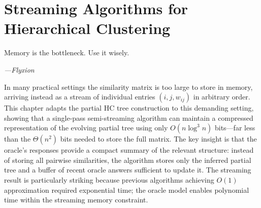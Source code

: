 \chapter{Streaming Algorithms for Hierarchical Clustering}
\label{ch:streaming}

\epigraph{%
  Memory is the bottleneck. Use it wisely.%
}{\textit{---Flyxion}}

In many practical settings the similarity matrix is too large to store in memory, arriving instead as a stream of individual entries $(i, j, w_{ij})$ in arbitrary order. This chapter adapts the partial HC tree construction to this demanding setting, showing that a single-pass semi-streaming algorithm can maintain a compressed representation of the evolving partial tree using only $O(n\log^3 n)$ bits---far less than the $\Theta(n^2)$ bits needed to store the full matrix. The key insight is that the oracle's responses provide a compact summary of the relevant structure: instead of storing all pairwise similarities, the algorithm stores only the inferred partial tree and a buffer of recent oracle answers sufficient to update it. The streaming result is particularly striking because previous algorithms achieving $O(1)$ approximation required exponential time; the oracle model enables polynomial time within the streaming memory constraint.

